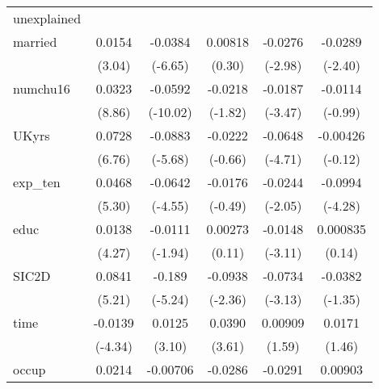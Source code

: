 \begin{table}[htbp]
\begin{tabular}{l*{5}{c}}
\hline
unexplained &                     &                     &                     &                     &                     \\
married     &      0.0154\sym{**} &     -0.0384\sym{***}&     0.00818         &     -0.0276\sym{**} &     -0.0289\sym{*}  \\
            &      (3.04)         &     (-6.65)         &      (0.30)         &     (-2.98)         &     (-2.40)         \\
numchu16    &      0.0323\sym{***}&     -0.0592\sym{***}&     -0.0218         &     -0.0187\sym{***}&     -0.0114         \\
            &      (8.86)         &    (-10.02)         &     (-1.82)         &     (-3.47)         &     (-0.99)         \\
UKyrs       &      0.0728\sym{***}&     -0.0883\sym{***}&     -0.0222         &     -0.0648\sym{***}&    -0.00426         \\
            &      (6.76)         &     (-5.68)         &     (-0.66)         &     (-4.71)         &     (-0.12)         \\
exp\_ten     &      0.0468\sym{***}&     -0.0642\sym{***}&     -0.0176         &     -0.0244\sym{*}  &     -0.0994\sym{***}\\
            &      (5.30)         &     (-4.55)         &     (-0.49)         &     (-2.05)         &     (-4.28)         \\
educ        &      0.0138\sym{***}&     -0.0111         &     0.00273         &     -0.0148\sym{**} &    0.000835         \\
            &      (4.27)         &     (-1.94)         &      (0.11)         &     (-3.11)         &      (0.14)         \\
SIC2D       &      0.0841\sym{***}&      -0.189\sym{***}&     -0.0938\sym{*}  &     -0.0734\sym{**} &     -0.0382         \\
            &      (5.21)         &     (-5.24)         &     (-2.36)         &     (-3.13)         &     (-1.35)         \\
time        &     -0.0139\sym{***}&      0.0125\sym{**} &      0.0390\sym{***}&     0.00909         &      0.0171         \\
            &     (-4.34)         &      (3.10)         &      (3.61)         &      (1.59)         &      (1.46)         \\
occup       &      0.0214\sym{***}&    -0.00706         &     -0.0286         &     -0.0291\sym{***}&     0.00903         \\

\end{tabular}
\end{table}
